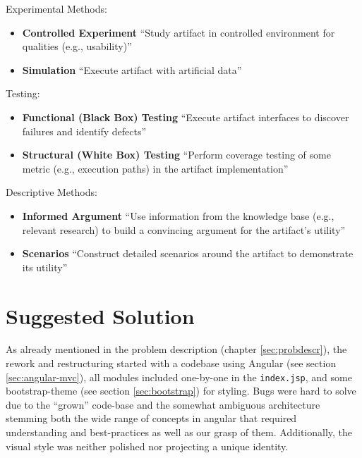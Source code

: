 \documentclass[a4paper,,tablecaptionabove]{scrbook}
\newcommand{\passthrough}[1]{#1}
\providecommand{\tightlist}{%
  \setlength{\itemsep}{0pt}\setlength{\parskip}{0pt}}
\begin{document}
Experimental Methods:

\begin{itemize}
\tightlist
\item
  \textbf{Controlled Experiment} \enquote{Study artifact in controlled
  environment for qualities (e.g., usability)}
\item
  \textbf{Simulation} \enquote{Execute artifact with artificial data}
\end{itemize}

Testing:

\begin{itemize}
\tightlist
\item
  \textbf{Functional (Black Box) Testing} \enquote{Execute artifact
  interfaces to discover failures and identify defects}
\item
  \textbf{Structural (White Box) Testing} \enquote{Perform coverage
  testing of some metric (e.g., execution paths) in the artifact
  implementation}
\end{itemize}

Descriptive Methods:

\begin{itemize}
\tightlist
\item
  \textbf{Informed Argument} \enquote{Use information from the knowledge
  base (e.g., relevant research) to build a convincing argument for the
  artifact's utility} 
\item
  \textbf{Scenarios} \enquote{Construct detailed scenarios around the
  artifact to demonstrate its utility}
\end{itemize}

\hypertarget{sec:suggested-solution}{%
\chapter{Suggested Solution}\label{sec:suggested-solution}}

As already mentioned in the problem description (chapter
\ref{sec:probdescr}), the rework and restructuring started with a
codebase using Angular (see section \ref{sec:angular-mvc}), all modules
included one-by-one in the \passthrough{\lstinline!index.jsp!}, and some
bootstrap-theme (see section \ref{sec:bootstrap}) for styling. Bugs were
hard to solve due to the \enquote{grown} code-base and the somewhat
ambiguous architecture stemming both the wide range of concepts in
angular that required understanding and best-practices as well as our
grasp of them. Additionally, the visual style was neither polished nor
projecting a unique identity.
\end{document}
